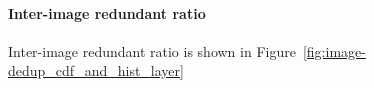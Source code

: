 \paragraph{Inter-image redundant ratio} Inter-image redundant ratio is shown in Figure~\ref{fig:image-dedup_cdf_and_hist_layer}



